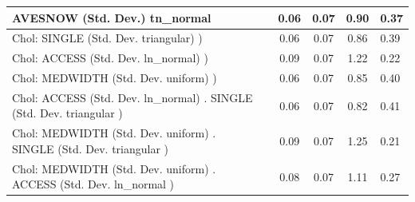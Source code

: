 \begin{table}
\begin{center}
\begin{tabular}{|l|l|c|c|c|l|}
			\hline
			AVESNOW (Std. Dev.) tn_normal &  & 0.06 & 0.07 & 0.90 & 0.37 \\
			\hline
			 Chol: SINGLE (Std. Dev. triangular) ) &  & 0.06 & 0.07 & 0.86 & 0.39 \\
			\hline
			 Chol: ACCESS (Std. Dev. ln_normal) ) &  & 0.09 & 0.07 & 1.22 & 0.22 \\
			\hline
			 Chol: MEDWIDTH (Std. Dev. uniform) ) &  & 0.06 & 0.07 & 0.85 & 0.40 \\
			\hline
			 Chol: ACCESS (Std. Dev. ln_normal) . SINGLE (Std. Dev.   triangular ) &  & 0.06 & 0.07 & 0.82 & 0.41 \\
			\hline
			 Chol: MEDWIDTH (Std. Dev. uniform) . SINGLE (Std. Dev.   triangular ) &  & 0.09 & 0.07 & 1.25 & 0.21 \\
			\hline
			 Chol: MEDWIDTH (Std. Dev. uniform) . ACCESS (Std. Dev.   ln_normal ) &  & 0.08 & 0.07 & 1.11 & 0.27 \\
			\hline
		\end{tabular}
	\end{center}
\end{table}